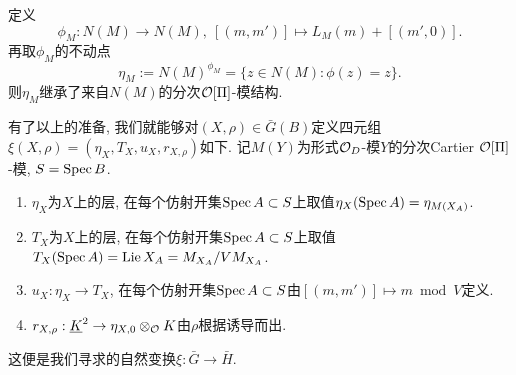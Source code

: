 定义\[\phi_M : N(M)\to N(M),\ [(m, m')]\mapsto L_M(m) + [(m', 0)].\]
再取$\phi_M$的不动点\[\eta_M := N(M)^{\phi_M} = \{z\in N(M) : \phi(z) = z\}.\]
则$\eta_M$继承了来自$N(M)$的分次$\mathcal{O}[\Pi]$-模结构.

有了以上的准备, 我们就能够对$(X, \rho)\in \bar{G}(B)$定义四元组$\xi(X, \rho) = (\eta_X, T_X, u_X, r_{X, \rho})$如下. 记$M(Y)$为形式$\mathcal{O}_D$-模$Y$的分次Cartier $\mathcal{O}[\Pi]$-模, $S = \operatorname{Spec} B$.
\begin{enumerate}
    \item [\myit] $\eta_X$为$X$上的层, 在每个仿射开集$\operatorname{Spec} A\subset S$上取值$\eta_X(\operatorname{Spec} A) = \eta_{M(X_A)}$.
    \item [\myit] $T_X$为$X$上的层, 在每个仿射开集$\operatorname{Spec} A\subset S$上取值$T_X(\operatorname{Spec} A) = \operatorname{Lie} X_A = M_{X_A}/VM_{X_A}$.
    \item [\myit] $u_X : \eta_X\to T_X$, 在每个仿射开集$\operatorname{Spec} A\subset S$由$[(m, m')]\mapsto m\bmod V$定义.
    \item [\myit] $r_{X, \rho} : \underline{K}^2\to \eta_{X, 0}\otimes_{\mathcal{O}} K$由$\rho$根据\cite[II, 7.5]{BC91}\;诱导而出.
\end{enumerate}
这便是我们寻求的自然变换$\xi : \bar{G}\to\bar{H}$.


